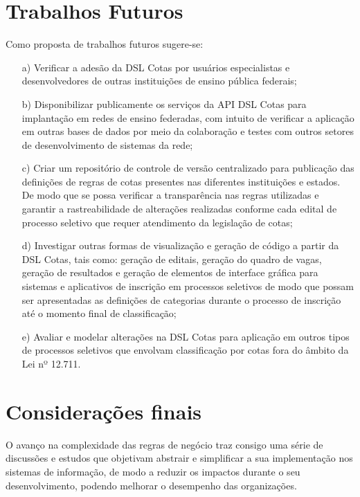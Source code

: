 \section{Trabalhos Futuros}
\label{trabalhosfuturos}

Como proposta de trabalhos futuros sugere-se:

\begin{enumerate}
    \item [a)] Verificar a adesão da DSL Cotas por usuários especialistas e desenvolvedores de outras instituições de ensino pública federais;
    \item [b)] Disponibilizar publicamente os serviços da API DSL Cotas para implantação em redes de ensino federadas, com intuito de verificar a aplicação em outras bases de dados por meio da colaboração e testes com outros setores de desenvolvimento de sistemas da rede; 
    \item [c)] Criar um repositório de controle de versão centralizado para publicação das definições de regras de cotas presentes nas diferentes instituições e estados. De modo que se possa verificar a transparência nas regras utilizadas e garantir a rastreabilidade de alterações realizadas conforme cada edital de processo seletivo que requer atendimento da legislação de cotas;
    \item [d)] Investigar outras formas de visualização e geração de código a partir da DSL Cotas, tais como: geração de editais, geração do quadro de vagas, geração de resultados e geração de elementos de interface gráfica para sistemas e aplicativos de inscrição em processos seletivos de modo que possam ser apresentadas as definições de categorias durante o processo de inscrição até o momento final de classificação;
    \item [e)] Avaliar e modelar alterações na DSL Cotas para aplicação em outros tipos de processos seletivos que envolvam classificação por cotas fora do âmbito da Lei nº 12.711.
\end{enumerate}

\section{Considerações finais}
\label{considfinal}

O avanço na complexidade das regras de negócio traz consigo uma série de discussões e estudos que objetivam abstrair e simplificar a sua implementação nos sistemas de informação, de modo a reduzir os impactos durante o seu desenvolvimento, podendo melhorar o desempenho das organizações.

